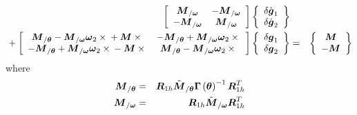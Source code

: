 \documentclass[10pt,dvips,fleqn]{report}
\newcommand{\T}[1]{\boldsymbol{#1}}
\begin{document}
\begin{eqnarray*}
	\sqbr{\matr{cc}{
		\T{M}_{/\T{\omega}} & - \T{M}_{/\T{\omega}} \\
		- \T{M}_{/\T{\omega}} & \T{M}_{/\T{\omega}}
	}}\cubr{\cvvect{
		\delta\dot{\T{g}}_1 \\
		\delta\dot{\T{g}}_2
	}} & & \\
	\mbox{} + \sqbr{\matr{cc}{
		\T{M}_{/\T{\theta}} - \T{M}_{/\T{\omega}} \T{\omega}_2\times{} + \T{M}\times{} & 
			- \T{M}_{/\T{\theta}} + \T{M}_{/\T{\omega}} \T{\omega}_2\times{} \\
		- \T{M}_{/\T{\theta}} + \T{M}_{/\T{\omega}} \T{\omega}_2\times{} - \T{M}\times{} & 
			\T{M}_{/\T{\theta}} - \T{M}_{/\T{\omega}} \T{\omega}_2\times{}
	}}\cubr{\cvvect{
		\delta\T{g}_1 \\
		\delta\T{g}_2
	}} & = & \cubr{\cvvect{
		\T{M} \\
		- \T{M}
	}}
\end{eqnarray*}
where
\begin{eqnarray*}
	\T{M}_{/\T{\theta}} & = & \T{R}_{1h} \tilde{\T{M}}_{/\T{\theta}} \T{\Gamma}\plbr{\T{\theta}}^{-1} \T{R}_{1h}^T \\
	\T{M}_{/\T{\omega}} & = & \T{R}_{1h} \tilde{\T{M}}_{/\T{\omega}} \T{R}_{1h}^T
\end{eqnarray*}
\end{document}
